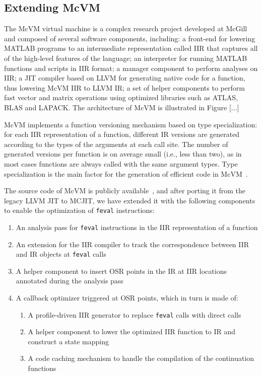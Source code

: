 \subsection{Extending McVM}
The McVM virtual machine is a complex research project developed at McGill and composed of several software components, including: a front-end for lowering MATLAB programs to an intermediate representation called IIR that captures all of the high-level features of the language; an interpreter for running MATLAB functions and scripts in IIR format; a manager component to perform analyses on IIR; a JIT compiler based on LLVM for generating native code for a function, thus lowering McVM IIR to LLVM IR; a set of helper components to perform fast vector and matrix operations using optimized libraries such as ATLAS, BLAS and LAPACK. The architecture of McVM is illustrated in Figure [...]

McVM implements a function versioning mechanism based on type specialization: for each IIR representation of a function, different IR versions are generated according to the types of the arguments at each call site. The number of generated versions per function is on average small (i.e., less than two), as in most cases functions are always called with the same argument types. Type specialization is the main factor for the generation of efficient code in McVM~\cite{chevalier2010mcvm}.

The source code of McVM is publicly available~\cite{mcvm}, and after porting it from the legacy LLVM JIT to MCJIT, we have extended it with the following components to enable the optimization of {\tt feval} instructions:
\begin{enumerate}
\item An analysis pass for {\tt feval} instructions in the IIR representation of a function
\item An extension for the IIR compiler to track the correspondence between IIR and IR objects at {\tt feval} calls
\item A helper component to insert OSR points in the IR at IIR locations annotated during the analysis pass
\item A callback optimizer triggered at OSR points, which in turn is made of:
\begin{enumerate}
\item A profile-driven IIR generator to replace {\tt feval} calls with direct calls
\item A helper component to lower the optimized IIR function to IR and construct a state mapping 
\item A code caching mechanism to handle the compilation of the continuation functions
\end{enumerate}
\end{enumerate}

